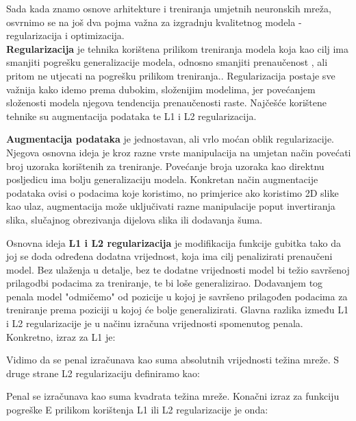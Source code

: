 Sada kada znamo osnove arhitekture i treniranja umjetnih neuronskih mreža, osvrnimo se na još dva pojma važna za izgradnju kvalitetnog modela - regularizacija i optimizacija.\\

\noindent \textbf{Regularizacija} je tehnika korištena prilikom treniranja modela koja kao cilj ima smanjiti pogrešku generalizacije modela, odnosno smanjiti prenaučenost , ali pritom ne utjecati na pogrešku prilikom treniranja.\citep{deeplearningbook}. Regularizacija postaje sve važnija kako idemo prema dubokim, složenijim modelima, jer povećanjem složenosti modela njegova tendencija prenaučenosti raste. Najčešće korištene tehnike su augmentacija podataka te L1 i L2 regularizacija. 

\textbf{Augmentacija podataka}  je jednostavan, ali vrlo moćan oblik regularizacije. Njegova osnovna ideja je kroz razne vrste manipulacija na umjetan način povećati broj uzoraka korištenih za treniranje. Povećanje broja uzoraka kao direktnu posljedicu ima bolju generalizaciju modela. Konkretan način augmentacije podataka ovisi o podacima koje koristimo, no primjerice ako koristimo 2D slike kao ulaz, augmentacija može uključivati razne manipulacije poput invertiranja slika, slučajnog obrezivanja dijelova slika ili dodavanja šuma.

Osnovna ideja \textbf{L1 i L2 regularizacija} je modifikacija funkcije gubitka tako da joj se doda određena dodatna vrijednost, koja ima cilj penalizirati prenaučeni model. Bez ulaženja u detalje, bez te dodatne vrijednosti model bi težio savršenoj prilagodbi podacima za treniranje, te bi loše generalizirao. Dodavanjem tog penala model "odmičemo" od pozicije u kojoj je savršeno prilagođen podacima za treniranje prema poziciji u kojoj će bolje generalizirati. Glavna razlika između L1 i L2 regularizacije je u načinu izračuna vrijednosti spomenutog penala. Konkretno, izraz za L1 je:

\begin{myequation}%
\end{myequation}

Vidimo da se penal izračunava kao suma absolutnih vrijednosti težina mreže.  S druge strane L2 regularizaciju definiramo kao:

\begin{myequation}%
\end{myequation}

Penal se izračunava kao suma kvadrata težina mreže. Konačni izraz za funkciju pogreške E prilikom korištenja L1 ili L2 regularizacije je onda:

